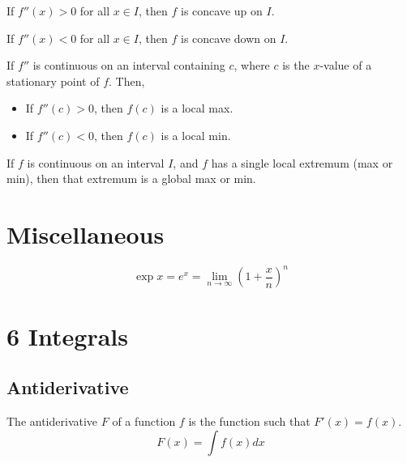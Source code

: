 \begin{theorem}
  If $f''(x) > 0$ for all $x \in I$, then $f$ is concave up on $I$.

  If $f''(x) < 0$ for all $x \in I$, then $f$ is concave down on $I$.
\end{theorem}

\begin{theorem}
  If $f''$ is continuous on an interval containing $c$, where $c$ is the $x$-value of a stationary point of $f$. Then,
  \begin{itemize}
    \item If $f''(c) > 0$, then $f(c)$ is a local max.
    \item If $f''(c) < 0$, then $f(c)$ is a local min.
  \end{itemize}
\end{theorem}

\begin{theorem}
  If $f$ is continuous on an interval $I$, and $f$ has a single local extremum (max or min), then that extremum is a global max or min.
\end{theorem}

\section*{Miscellaneous}

\begin{definition}
  \[
    \exp x = e^x = \lim_{n \to \infty} \left(1 + \frac{x}{n}\right)^n
  \]
\end{definition}

\columnbreak

\section*{6 Integrals}

\subsection*{Antiderivative}

\begin{definition}
  The antiderivative $F$ of a function $f$ is the function such that $F'(x) = f(x)$.
  \[
    F(x) = \int f(x) dx
  \]
\end{definition}

